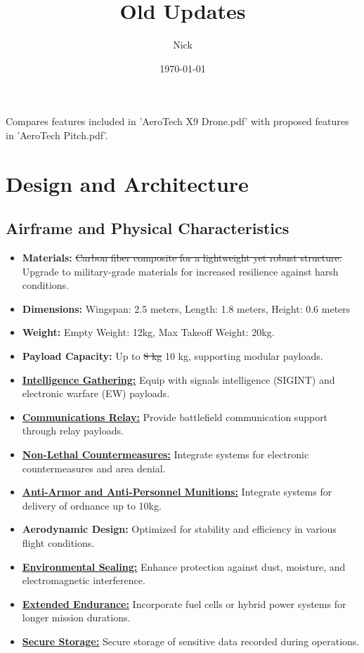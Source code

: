 \documentclass{article}
\title{Old Updates}
\author{Nick}
\date{\today}
\begin{document}
\maketitle

\sloppy\par Compares features included in 'AeroTech X9 Drone.pdf' with proposed features in 'AeroTech Pitch.pdf'.

\section{Design and Architecture}
\subsection{Airframe and Physical Characteristics}
\begin{itemize}
    \item \textbf{Materials:} \st{Carbon fiber composite for a lightweight yet robust structure.} Upgrade to military-grade materials for increased resilience against harsh conditions.
    \item \textbf{Dimensions:} Wingspan: 2.5 meters, Length: 1.8 meters, Height: 0.6 meters
    \item \textbf{Weight:} Empty Weight: 12\si{kg}, Max Takeoff Weight: 20\si{kg}.
    \item \textbf{Payload Capacity:} Up to \st{8 kg} 10 kg, supporting modular payloads.
    \item \textbf{\underline{Intelligence Gathering:}} Equip with signals intelligence (SIGINT) and electronic warfare (EW) payloads.
    \item \textbf{\underline{Communications Relay:}} Provide battleﬁeld communication support through relay payloads.
    \item \textbf{\underline{Non-Lethal Countermeasures:}} Integrate systems for electronic countermeasures and area denial.
    \item \textbf{\underline{Anti-Armor and Anti-Personnel Munitions:}} Integrate systems for delivery of ordnance up to 10kg.
    \item \textbf{Aerodynamic Design:} Optimized for stability and efficiency in various flight conditions.
    \item \textbf{\underline{Environmental Sealing:}} Enhance protection against dust, moisture, and electromagnetic interference.
    \item \textbf{\underline{Extended Endurance:}} Incorporate fuel cells or hybrid power systems for longer mission durations.
    \item \textbf{\underline{Secure Storage:}} Secure storage of sensitive data recorded during operations.
\end{itemize}
\end{document}
